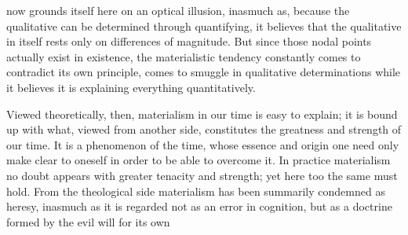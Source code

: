 \documentclass[12pt,a4paper,openany]{book}
\newcommand{\opage}[1]{\marginnote{\footnotesize\textit{[#1]}}}
\begin{document}
\opage{198}now grounds itself here on an optical illusion, inasmuch as,
because the qualitative can be determined through quantifying,
it believes that the qualitative in itself rests only on differences of magnitude.
But since those nodal points actually exist in
existence, the materialistic tendency constantly comes to
contradict its own principle, comes to smuggle in qualitative
determinations while it believes it is explaining everything quantitatively.

Viewed theoretically, then, materialism in our time is easy
to explain; it is bound up with what, viewed from another
side, constitutes the greatness and strength of our time. It is a
phenomenon of the time, whose essence and origin one need only
make clear to oneself in order to be able to overcome it. In practice
materialism no doubt appears with greater tenacity and strength;
yet here too the same must hold. From the theological
side materialism has been summarily condemned as heresy,
inasmuch as it is regarded not as an error in cognition,
but as a doctrine formed by the evil will for its own
\end{document}
